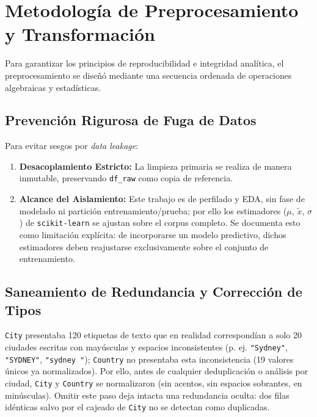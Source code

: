 \documentclass[journal,twocolumn,spanish]{IEEEtran}
\begin{document}
\section{Metodología de Preprocesamiento y Transformación}
Para garantizar los principios de reproducibilidad e integridad analítica, el preprocesamiento se diseñó mediante una secuencia ordenada de operaciones algebraicas y estadísticas.

\subsection{Prevención Rigurosa de Fuga de Datos}
Para evitar sesgos por \emph{data leakage}:
\begin{enumerate}
    \item \textbf{Desacoplamiento Estricto:} La limpieza primaria se realiza de manera inmutable, preservando \texttt{df\_raw} como copia de referencia.
    \item \textbf{Alcance del Aislamiento:} Este trabajo es de perfilado y EDA, sin fase de modelado ni partición entrenamiento/prueba; por ello los estimadores ($\mu$, $\tilde{x}$, $\sigma$) de \texttt{scikit-learn} \cite{Pedregosa2011} se ajustan sobre el corpus completo. Se documenta esto como limitación explícita: de incorporarse un modelo predictivo, dichos estimadores deben reajustarse exclusivamente sobre el conjunto de entrenamiento.
\end{enumerate}

\subsection{Saneamiento de Redundancia y Corrección de Tipos}
\label{sec:redundancia}
\texttt{City} presentaba 120 etiquetas de texto que en realidad correspondían a solo 20 ciudades escritas con mayúsculas y espacios inconsistentes (p. ej. \texttt{"Sydney"}, \texttt{"SYDNEY"}, \texttt{"sydney "}); \texttt{Country} no presentaba esta inconsistencia (19 valores únicos ya normalizados). Por ello, antes de cualquier deduplicación o análisis por ciudad, \texttt{City} y \texttt{Country} se normalizaron (sin acentos, sin espacios sobrantes, en minúsculas). Omitir este paso deja intacta una redundancia oculta: dos filas idénticas salvo por el cajeado de \texttt{City} no se detectan como duplicadas.
\end{document}

